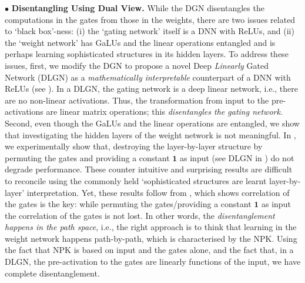 $\bullet$ \textbf{Disentangling Using Dual View.} While the DGN disentangles the computations in the gates from those in the weights, there are two issues related to `black box'-ness: (i) the `gating network' itself is a DNN with ReLUs, and (ii) the `weight network' has GaLUs and the linear operations entangled and is perhaps learning sophisticated structures in its hidden layers. To address these issues, first, we modify the DGN  to propose a novel Deep \emph{Linearly} Gated Network (DLGN) as a \emph{mathematically interpretable} counterpart of a DNN with ReLUs (see ).  In a DLGN, the gating network is a deep linear network, i.e., there are no non-linear activations. Thus, the transformation from input to the pre-activations are linear matrix operations; this \emph{disentangles the gating network}. Second, even though the GaLUs and the linear operations are entangled, we show that investigating the hidden layers of the weight network is not meaningful. In , we experimentally show that, destroying the layer-by-layer structure by permuting the gates and providing a constant $\mathbf{1}$ as input (see DLGN in ) do not  degrade performance. These counter intuitive and surprising results are difficult to reconcile using the commonly held `sophisticated structures are learnt layer-by-layer' interpretation.  Yet, these results follow from , which shows correlation of the gates is the key: while permuting the gates/providing a constant $\mathbf{1}$ as input the correlation of the gates is not lost. In other words, the \emph{disentanglement  happens in the path space}, i.e., the right approach is to think that learning in the weight network happens path-by-path, which is characterised by the NPK. Using the fact that NPK is based on input and the gates alone, and the fact that, in a DLGN, the pre-activation to the gates are linearly functions of the input, we have complete disentanglement.


